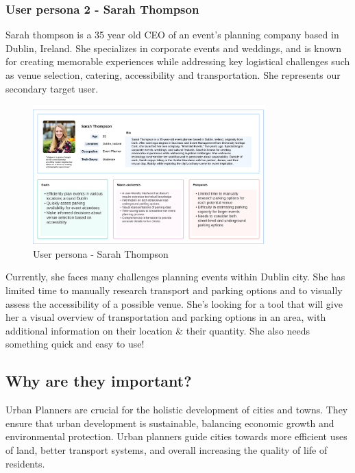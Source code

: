 \documentclass[preview]{standalone}
\begin{document}
\subsubsection{User persona 2 - Sarah Thompson}
Sarah thompson is a 35 year old CEO of an event's planning company based in
Dublin, Ireland. She specializes in corporate events and weddings, and is known
for creating memorable experiences while addressing key logistical challenges
such as venue selection, catering, accessibility and transportation. She
represents our secondary target user.

\begin{figure}[htbp!]
    \centering{}{}
    \includegraphics[width=0.8\textwidth]{images/sarah-thompson-userpersona.png}
    \caption{User persona - Sarah Thompson}
\end{figure}

\newpage{}

Currently, she faces many challenges planning events within Dublin city. She has
limited time to manually research transport and parking options and to visually
assess the accessibility of a possible venue. She's looking for a tool that will
give her a visual overview of transportation and parking options in an area,
with additional information on their location  \& their quantity. She also needs
something quick and easy to use!

\subsection{Why are they important?}
Urban Planners are crucial for the holistic development of cities and towns.
They ensure that urban development is sustainable, balancing economic growth and
environmental protection. Urban planners guide cities towards more efficient
uses of land, better transport systems, and overall increasing the quality of
life of residents.
\end{document}
